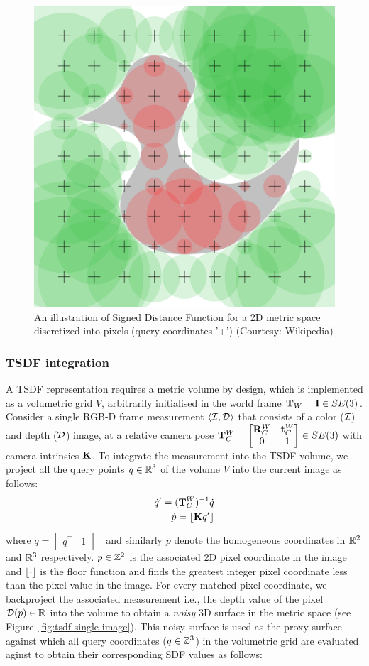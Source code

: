 \begin{figure}[htpb]
    \centering
    \includegraphics[width=0.5\linewidth]{figs/2d-sdf.png}
    \caption{An illustration of Signed Distance Function for a 2D metric space discretized into pixels (query coordinates '+') (Courtesy: Wikipedia)}%
    \label{fig:figs/2d-sdf}
\end{figure}

\subsubsection{TSDF integration}

A TSDF representation requires a metric volume by design, which is implemented as a volumetric grid $V$, arbitrarily initialised in the world frame $\mathbf{T}_W = \mathbf{I} \in SE(3)$. Consider a single RGB-D frame measurement $\langle \mathcal{I}, \mathcal{D} \rangle$ that consists of a color ($\mathcal{I}$) and depth ($\mathcal{D}$) image, at a relative camera pose $\mathbf{T}_C^W  = \begin{bmatrix}
    \mathbf{R}_C^W & \mathbf{t}_C^W \\ 0 & 1
\end{bmatrix}\in SE(3)$ with camera intrinsics $\mathbf{K}$. To integrate the measurement into the TSDF volume, we project  all the query points $q \in \mathbb{R}^3$ of the volume $V$ into the current image as follows:
\begin{align}
    \dot{q}^\prime = (\mathbf{T}_C^W)^{-1} \dot{q} \\
    \dot{p} = \lfloor \mathbf{K} q^\prime\rfloor
\end{align}
where $\dot{q} = \begin{bmatrix}
    q^\top & 1
\end{bmatrix}^\top$  and similarly $\dot{p}$ denote the homogeneous coordinates in $\mathbb{R}^2$ and $\mathbb{R}^3$ respectively. $p \in \mathbb{Z}^2$ is the associated 2D pixel coordinate in the image and $\lfloor \cdot \rfloor$ is the floor function and finds the greatest integer pixel coordinate less than the pixel value in the image. For every matched pixel coordinate, we backproject the associated measurement i.e., the depth value of the pixel $\mathcal{D}(p) \in \mathbb{R}$ into the volume to obtain a \emph{noisy} 3D surface in the metric space (see Figure~\ref{fig:tsdf-single-image}). This noisy surface is used as the proxy surface against which all query coordinates ($q \in \mathbb{Z}^3$) in the volumetric grid are evaluated aginst to obtain their corresponding SDF values as follows:

